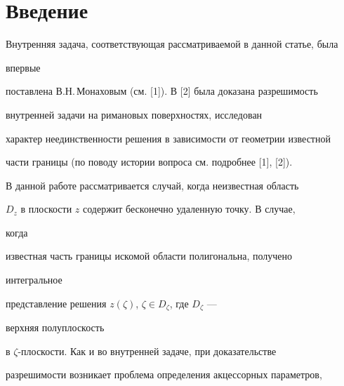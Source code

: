  


\date{} 




\pagestyle{plain} %


 




\maketitle 


\label{begin} 


 


 


\section*{Введение} 


 


Внутренняя задача, соответствующая рассматриваемой в данной статье, была 


впервые 


поставлена В.Н.\,Монаховым (см. [1]). В [2] была доказана разрешимость 


внутренней задачи на римановых поверхностях, исследован 


характер неединственности решения в зависимости от геометрии известной 


части границы (по поводу истории вопроса см. подробнее [1], [2]). 


 


В данной работе рассматривается случай, когда неизвестная область 


$D_z$ в плоскости $z$ содержит бесконечно удаленную точку. В случае, 


когда 


известная часть границы искомой области полигональна, получено 


интегральное 


представление решения $z(\zeta)$, $\zeta\in D_\zeta$, где $D_\zeta$ --- 


верхняя полуплоскость 


в $\zeta$-плоскости. Как и во внутренней задаче, при доказательстве 


разрешимости возникает проблема определения акцессорных параметров, 


